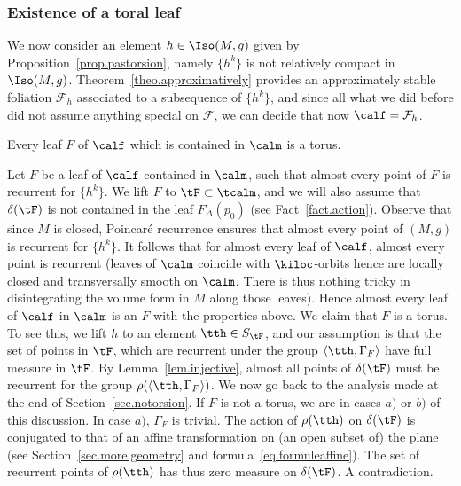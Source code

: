 \subsubsection{Existence of a toral leaf}\label{sec.toralproof}
We now consider an element $h \in \Iso(M,g)$ given by Proposition~\ref{prop.pastorsion}, namely $\{ h^k \}$ is not relatively compact in $\Iso(M,g)$. Theorem~\ref{theo.approximatively} provides an approximately stable foliation ${\mathcal F}_h$ associated to a subsequence of $\{ h^k \}$, and since all what we did before did not assume anything special on ${\mathcal F}$, we can decide that now $\calf={\mathcal F}_h$.

\begin{prop}\label{prop.existence.tori}
Every leaf $F$ of $\calf$ which is contained in $\calm$ is a torus.
\end{prop}

Let $F$ be a leaf of $\calf$ contained in $\calm$, such that almost every point of $F$ is recurrent for $\{ h^k \}$. We lift $F$ to $\tF \subset \tcalm$, and we will also assume that $\delta(\tF)$ is not contained in the leaf $F_{\Delta}(p_0)$ (see Fact~\ref{fact.action}). Observe that since $M$ is closed, Poincaré recurrence ensures that almost every point of $(M,g)$ is recurrent for $\{ h^k \}$. It follows that for almost every leaf of $\calf$, almost every point is recurrent (leaves of $\calm$ coincide with $\kiloc$-orbits hence are locally closed and transversally smooth on $\calm$. There is thus nothing tricky in disintegrating the volume form in $M$ along those leaves). Hence almost every leaf of $\calf$ in $\calm$ is an $F$ with the properties above. We claim that $F$ is a torus. To see this, we lift $h$ to an element $\tth \in S_{\tF}$, and our assumption is that the set of points in $\tF$, which are recurrent under the group $\langle \tth, \Gamma_{F}\rangle$ have full measure in $\tF$. By Lemma~\ref{lem.injective}, almost all points of $\delta(\tF)$ must be recurrent for the group $\rho(\langle \tth,\Gamma_{F}\rangle)$. We now go back to the analysis made at the end of Section~\ref{sec.notorsion}. If $F$ is not a torus, we are in cases $a)$ or $b)$ of this discussion. In case $a)$, $\Gamma_F$ is trivial. The action of $\rho(\tth)$ on $\delta(\tF)$ is conjugated to that of an affine transformation on (an open subset of) the plane (see Section~\ref{sec.more.geometry} and formula~\eqref{eq.formuleaffine}). The set of recurrent points of $\rho(\tth)$ has thus zero measure on $\delta(\tF)$. A contradiction.

